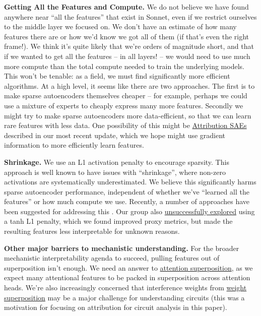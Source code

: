 \documentclass{article}
\begin{document}
\textbf{Getting All the Features and Compute.} We do not believe we have found anywhere near “all the features” that exist in Sonnet, even if we restrict ourselves to the middle layer we focused on. We don't have an estimate of how many features there are or how we'd know we got all of them (if that's even the right frame!). We think it's quite likely that we're orders of magnitude short, and that if we wanted to get all the features -- in all layers! -- we would need to use much more compute than the total compute needed to train the underlying models. This won't be tenable: as a field, we must find significantly more efficient algorithms. At a high level, it seems like there are two approaches. The first is to make sparse autoencoders themselves cheaper -- for example, perhaps we could use a mixture of experts \cite{fedus2021switch} to cheaply express many more features. Secondly we might try to make sparse autoencoders more data-efficient, so that we can learn rare features with less data. One possibility of this might be \href{https://transformer-circuits.pub/2024/april-update/index.html\#attr-dl}{Attribution SAEs} described in our most recent update, which we hope might use gradient information to more efficiently learn features.

\textbf{Shrinkage.} We use an L1 activation penalty to encourage sparsity. This approach is well known to have issues with “shrinkage”, where non-zero activations are systematically underestimated. We believe this significantly harms sparse autoencoder performance, independent of whether we've “learned all the features” or how much compute we use. Recently, a number of approaches have been suggested for addressing this \cite{rajamanoharan2024improving,wright2024suppression}. Our group also \href{https://transformer-circuits.pub/2024/feb-update/index.html\#dict-learning-tanh}{unsuccessfully explored} using a tanh L1 penalty, which we found improved proxy metrics, but made the resulting features less interpretable for unknown reasons.

\textbf{Other major barriers to mechanistic understanding.} For the broader mechanistic interpretability agenda to succeed, pulling features out of superposition isn't enough. We need an answer to \href{https://transformer-circuits.pub/2024/jan-update/index.html\#attn-superposition}{attention superposition}, as we expect many attentional features to be packed in superposition across attention heads. We're also increasingly concerned that interference weights from \href{https://transformer-circuits.pub/2023/may-update/index.html\#weight-superposition}{weight superposition} may be a major challenge for understanding circuits (this was a motivation for focusing on attribution for circuit analysis in this paper).
\end{document}

